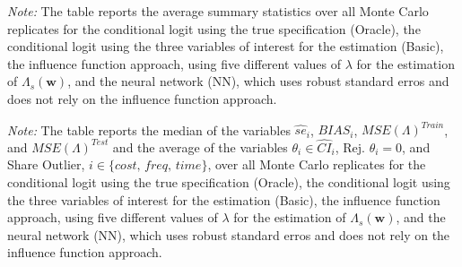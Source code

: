 \documentclass[a4paper, 12pt]{article}
\begin{document}
\begin{appendix}
\begin{table}[H]
\centering
\captionsetup{justification=centering}
	\caption{Average Summary Statistics of 1000 Monte Carlo Replicates for Large Data and without Repeated Sample Splitting}
	\label{tab:MC_swissmetroLargeMean}
	\small

 \begin{minipage}{0.825\textwidth} %
		{   \footnotesize \begin{singlespace}
\textit{Note:}	The table reports the average summary statistics over all Monte Carlo replicates for the conditional logit using the true specification (Oracle), the conditional logit using the three variables of interest for the estimation (Basic),  the influence function approach, using five different values of $\lambda$ for the estimation of  $\Lambda_s(\bm{w})$, and the neural network (NN), which uses robust standard erros and does not rely on the influence function approach.
			\end{singlespace}
			\par}
	\end{minipage}
\end{table}


\newpage


\begin{table}[H]
\centering
\captionsetup{justification=centering}
	\caption{Median Summary Statistics of 1000 Monte Carlo Replicates for Large Data and without Repeated Sample Splitting}
	\label{tab:MC_swissmetroLargeMedian}
	\small

 \begin{minipage}{0.825\textwidth} %
		{   \footnotesize \begin{singlespace}
\textit{Note:}	The table reports the median of the variables $\hat{se}_i$, $BIAS_i$,  $MSE(\Lambda)^{Train}$, and $MSE(\Lambda)^{Test}$  and the average of the variables $ \theta_{i} \in \hat{CI}_{i}$, Rej. $\theta_{i}=0$, and Share Outlier, $i \in \{cost,\, freq,\, time\}$, over all Monte Carlo replicates for the conditional logit using the true specification (Oracle), the conditional logit using the three variables of interest for the estimation (Basic),  the influence function approach, using five different values of $\lambda$ for the estimation of  $\Lambda_s(\bm{w})$, and the neural network (NN), which uses robust standard erros and does not rely on the influence function approach. 
			\end{singlespace}
			\par}
	\end{minipage}
\end{table}


\end{appendix}
\end{document}
